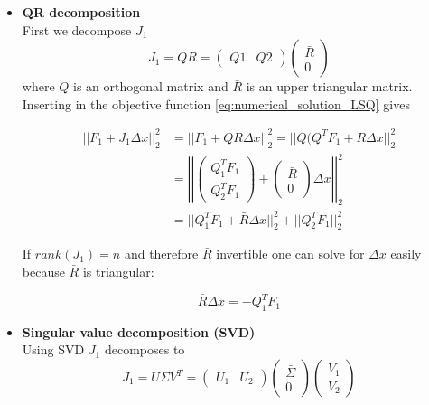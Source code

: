 \documentclass{scrartcl}[12pt, halfparskip]
\begin{document}
\begin{itemize}
	\item \textbf{QR decomposition} \\
	First we decompose $J_1$
	\begin{equation}
		J_1 = Q R = 
		\begin{pmatrix}
			Q1 & Q2
		\end{pmatrix}
		\begin{pmatrix}
			\bar{R} \\
			0
		\end{pmatrix}
	\end{equation}
	where $Q$ is an orthogonal matrix and $\bar{R}$ is an upper triangular matrix. Inserting in the objective function \eqref{eq:numerical_solution_LSQ} gives
	
	\begin{align}
		|| F_1 + J_1 \Delta x ||_2^2 & = || F_1 + Q R \Delta x ||_2^2 = || Q( Q^T F_1 + R \Delta x ||_2^2 \\
		& = \left| \left| \begin{pmatrix}
		Q_1^T F_1 \\
		Q_2^T F_1
		\end{pmatrix} + 
		\begin{pmatrix}
		\bar{R} \\
		0
		\end{pmatrix}
		\Delta x \right| \right|_2^2 \nonumber \\
		& = || Q_1^T F_1 + \bar{R} \Delta x ||_2^2 + ||Q_2^T F_1 ||_2^2 \nonumber
	\end{align}
	
	If $rank(J_1)=n$ and therefore $\bar{R}$ invertible one can solve for $\Delta x$ easily because $\bar{R}$ is triangular:
	
	\begin{equation}
		\bar{R} \Delta x = -Q_1^T F_1
	\end{equation}
	
	\item \textbf{Singular value decomposition (SVD)} \\
	Using SVD $J_1$ decomposes to
	\begin{equation}
		J_1 = U \Sigma V^T =
		\begin{pmatrix}
			U_1 & U_2
		\end{pmatrix}
		\begin{pmatrix}
			\bar{\Sigma} \\
			0
		\end{pmatrix}
		\begin{pmatrix}
			V_1 \\
			V_2
		\end{pmatrix}
	\end{equation}
	

\end{itemize}
\end{document}
